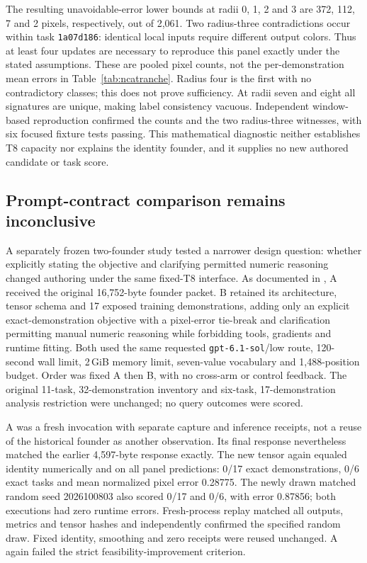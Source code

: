 \documentclass[11pt]{article}
\begin{document}
The resulting unavoidable-error lower bounds at radii 0, 1, 2 and 3 are
372, 112, 7 and 2 pixels, respectively, out of 2{,}061. Two radius-three
contradictions occur within task \texttt{1a07d186}: identical local inputs require
different output colors. Thus at least four updates are necessary to reproduce
this panel exactly under the stated assumptions. These are pooled pixel counts,
not the per-demonstration mean errors in Table~\ref{tab:ncatranche}. Radius four
is the first with no contradictory classes; this does not prove sufficiency.
At radii seven and eight all signatures are unique, making label consistency
vacuous. Independent window-based reproduction confirmed the counts and the
two radius-three witnesses, with six focused fixture tests passing. This
mathematical diagnostic neither establishes T8 capacity nor explains the
identity founder, and it supplies no new authored candidate or task score.

\subsection{Prompt-contract comparison remains inconclusive}\label{sec:ncaprompt}
A separately frozen two-founder study tested a narrower design question:
whether explicitly stating the objective and clarifying permitted numeric
reasoning changed authoring under the same fixed-T8 interface. As documented in
, A received the original
16{,}752-byte founder packet. B retained its architecture, tensor schema and
17 exposed training demonstrations, adding only an explicit exact-demonstration
objective with a pixel-error tie-break and clarification permitting manual
numeric reasoning while forbidding tools, gradients and runtime fitting.
Both used the same requested \texttt{gpt-6.1-sol}/low route, 120-second wall limit,
2\,GiB memory limit, seven-value vocabulary and 1{,}488-position budget. Order
was fixed A then B, with no cross-arm or control feedback. The original 11-task,
32-demonstration inventory and six-task, 17-demonstration analysis restriction
were unchanged; no query outcomes were scored.

A was a fresh invocation with separate capture and inference receipts, not a
reuse of the historical founder as another observation. Its final response
nevertheless matched the earlier 4{,}597-byte response exactly. The new tensor
again equaled identity numerically and on all panel predictions: 0/17 exact
demonstrations, 0/6 exact tasks and mean normalized pixel error 0.28775.
The newly drawn matched random seed 2026100803 also scored 0/17 and 0/6, with
error 0.87856; both executions had zero runtime errors. Fresh-process replay
matched all outputs, metrics and tensor hashes and independently confirmed the
specified random draw. Fixed identity, smoothing and zero receipts were reused
unchanged. A again failed the strict feasibility-improvement criterion.
\end{document}
